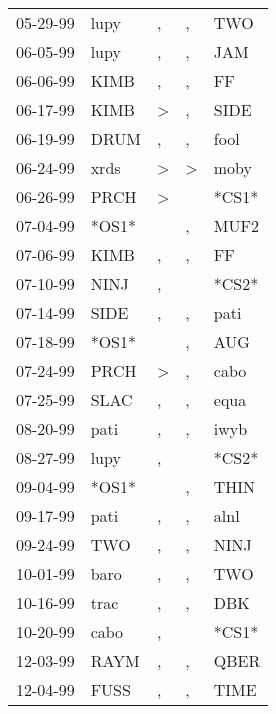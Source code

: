 \begin{supertabular}{lllll}
 05-29-99 &   lupy &                , &                , &    TWO \\
 06-05-99 &   lupy &                , &                , &    JAM \\
 06-06-99 &   KIMB &                , &                , &     FF \\
 06-17-99 &   KIMB &     \textgreater &                , &   SIDE \\
 06-19-99 &   DRUM &                , &                , &   fool \\
 06-24-99 &   xrds &     \textgreater &     \textgreater &   moby \\
 06-26-99 &   PRCH &     \textgreater &                  &  *CS1* \\
 07-04-99 &  *OS1* &                  &                , &   MUF2 \\
 07-06-99 &   KIMB &                , &                , &     FF \\
 07-10-99 &   NINJ &                , &                  &  *CS2* \\
 07-14-99 &   SIDE &                , &                , &   pati \\
 07-18-99 &  *OS1* &                  &                , &    AUG \\
 07-24-99 &   PRCH &     \textgreater &                , &   cabo \\
 07-25-99 &   SLAC &                , &                , &   equa \\
 08-20-99 &   pati &                , &                , &   iwyb \\
 08-27-99 &   lupy &                , &                  &  *CS2* \\
 09-04-99 &  *OS1* &                  &                , &   THIN \\
 09-17-99 &   pati &                , &                , &   alnl \\
 09-24-99 &    TWO &                , &                , &   NINJ \\
 10-01-99 &   baro &                , &                , &    TWO \\
 10-16-99 &   trac &                , &                , &    DBK \\
 10-20-99 &   cabo &                , &                  &  *CS1* \\
 12-03-99 &   RAYM &                , &                , &   QBER \\
 12-04-99 &   FUSS &                , &                , &   TIME \\

\end{supertabular}
